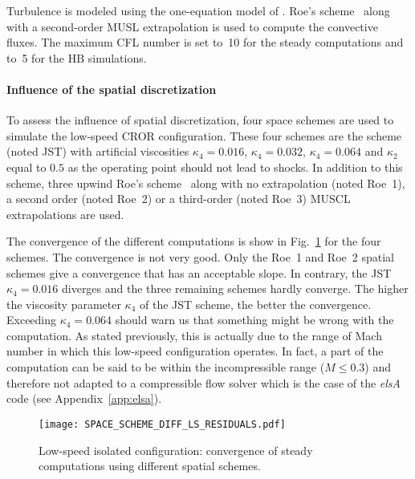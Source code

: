 Turbulence is modeled using the one-equation model of
\citet{Spalart1992}.  Roe's scheme~\cite{Roe1981} along with a 
second-order MUSL extrapolation 
is used to compute the convective fluxes.
The maximum CFL number is set to~10 for the steady 
computations and to~5 for the HB simulations.

\paragraph{Influence of the spatial discretization} %
\label{sub:dream_ls_spatial_discretization}

To assess the influence of spatial discretization, four 
space schemes are used to simulate the low-speed CROR configuration.
These four schemes are the \citet{Jameson1981} scheme (noted JST) with artificial
viscosities $\kappa_4 = 0.016$, $\kappa_4 = 0.032$, $\kappa_4 = 0.064$
and $\kappa_2$ equal to $0.5$ as the operating point should not 
lead to shocks. In addition to this scheme, three upwind
Roe's scheme~\cite{Roe1981} along with no extrapolation (noted Roe~1),
a second order (noted Roe~2) or a third-order (noted Roe~3) 
MUSCL extrapolations are used.

The convergence of the different computations is show 
in Fig.~\ref{fig:dream_ls_space_scheme_residual}
for the four schemes. The convergence is not 
very good. Only the Roe~1 and Roe~2 spatial schemes give 
a convergence that has an acceptable slope. In contrary,
the JST~$\kappa_4 = 0.016$ diverges and the three
remaining schemes hardly converge. The higher the
viscosity parameter $\kappa_4$ of the JST scheme, the better
the convergence. Exceeding $\kappa_4 = 0.064$ should
warn us that something might be wrong with the computation.
As stated previously, this is actually due to the range of Mach
number in which this low-speed configuration operates. In fact,
a part of the computation can be said to be within the incompressible
range ($M \leq 0.3$) and therefore not adapted to a compressible
flow solver which is the case of the \emph{elsA} code 
(see Appendix~\ref{app:elsa}).
\begin{figure}
  \centering
  \texttt{[image: SPACE\_SCHEME\_DIFF\_LS\_RESIDUALS.pdf]}
  \caption{Low-speed isolated configuration: convergence of 
  steady computations using different spatial schemes.}
  \label{fig:dream_ls_space_scheme_residual}
\end{figure}

